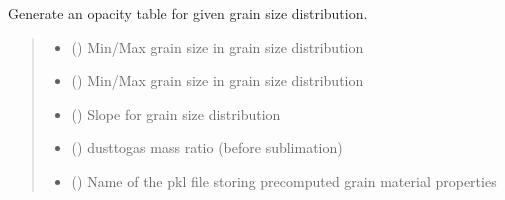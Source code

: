 \documentclass[a4paper,11pt,english]{sphinxmanual}
\begin{document}
\begin{fulllineitems}
\label{\detokenize{x22:disk_model.generate_opacity_table_x22}}
\pysigstartsignatures
\pysiglinewithargsret
{}
{\sphinxparamcomma {}\sphinxparamcomma {}\sphinxparamcomma {}\sphinxparamcomma {}\sphinxparamcomma {}\sphinxparamcomma {}\sphinxparamcomma {}}
{}
\pysigstopsignatures
\sphinxAtStartPar
Generate an opacity table for given grain size distribution.
\begin{quote}\begin{description}
\begin{itemize}
\item {} 
\sphinxAtStartPar
{} () \textendash{} Min/Max grain size in grain size distribution

\item {} 
\sphinxAtStartPar
{} () \textendash{} Min/Max grain size in grain size distribution

\item {} 
\sphinxAtStartPar
{} () \textendash{} Slope for grain size distribution

\item {} 
\sphinxAtStartPar
{} () \textendash{} dust\sphinxhyphen{}to\sphinxhyphen{}gas mass ratio (before sublimation)

\item {} 
\sphinxAtStartPar
{} () \textendash{} Name of the pkl file storing pre\sphinxhyphen{}computed grain material properties


\end{itemize}
\end{description}
\end{quote}
\end{fulllineitems}
\end{document}
